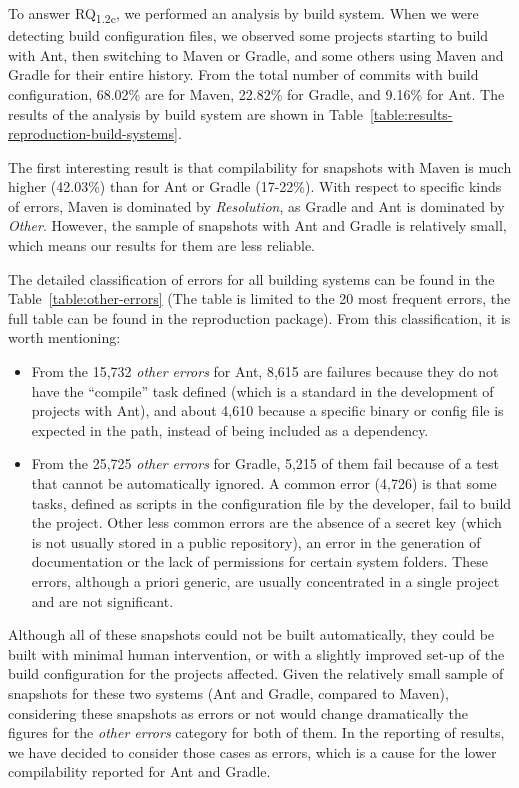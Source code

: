 To answer RQ\textsubscript{1.2c}, we performed an analysis by build system. When we were detecting build configuration files, we observed some projects starting to build with Ant, then switching to Maven or Gradle, and some others using Maven and Gradle for their entire history. From the total number of commits with build configuration, 68.02\% are for Maven, 22.82\% for Gradle, and 9.16\% for Ant. The results of the analysis by build system are shown in Table~\ref{table:results-reproduction-build-systems}.

The first interesting result is that compilability for snapshots with Maven is much higher (42.03\%) than for Ant or Gradle (17-22\%). With respect to specific kinds of errors, Maven is dominated by \textit{Resolution}, as Gradle and Ant is dominated by \textit{Other}. However, the sample of snapshots with Ant and Gradle is relatively small, which means our results for them are less reliable.

The detailed classification of errors for all building systems can be found in the Table~\ref{table:other-errors} (The table is limited to the 20 most frequent errors, the full table can be found in the reproduction package). 
From this classification, it is worth mentioning:
\begin{itemize}
 \item From the 15,732 \textit{other errors} for Ant, 8,615 are failures because they do not have the ``compile'' task defined (which is a standard in the development of projects with Ant), and about 4,610 because a specific binary or config file is expected in the path, instead of being included as a dependency.
 \item From the 25,725 \textit{other errors} for Gradle, 5,215 of them fail because of a test that cannot be automatically ignored. A common error (4,726) is that some tasks, defined as scripts in the configuration file by the developer, fail to build the project. Other less common errors are the absence of a secret key (which is not usually stored in a public repository), an error in the generation of documentation or the lack of permissions for certain system folders. These errors, although a priori generic, are usually concentrated in a single project and are not significant.
\end{itemize} 

Although all of these snapshots could not be built automatically, they could be built with minimal human intervention, or with a slightly improved set-up of the build configuration for the projects affected. Given the relatively small sample of snapshots for these two systems (Ant and Gradle, compared to Maven), considering these snapshots as errors or not would change dramatically the figures for the \textit{other errors} category for both of them. In the reporting of results, we have decided to consider those cases as errors, which is a cause for the lower compilability reported for Ant and Gradle.

